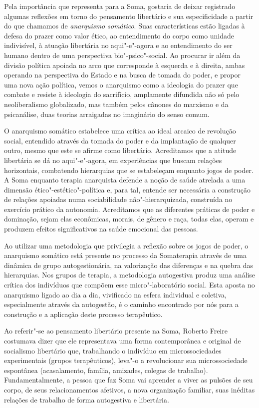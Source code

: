 Pela importância que representa para a Soma, gostaria de deixar
registrado algumas reflexões em torno do pensamento libertário e sua
especificidade a partir do que chamamos de \emph{anarquismo somático}. Suas
características estão ligadas à defesa do prazer como valor ético, ao
entendimento do corpo como unidade indivisível, à atuação libertária no
aqui"-e"-agora e ao entendimento do ser humano dentro de uma perspectiva
bio"-psico"-social. Ao procurar ir além da divisão política apoiada no
arco que corresponde à esquerda e à direita, ambas operando na
perspectiva do Estado e na busca de tomada do poder, e propor uma nova
ação política, vemos o anarquismo como a ideologia do prazer que combate
e resiste à ideologia do sacrifício, amplamente difundida não só pelo
neoliberalismo globalizado, mas também pelos cânones do marxismo e da
psicanálise, duas teorias arraigadas no imaginário do senso comum.

O anarquismo somático estabelece uma crítica ao ideal arcaico de
revolução social, entendido através da tomada do poder e da implantação
de qualquer outro, mesmo que este se afirme como libertário. Acreditamos
que a atitude libertária se dá no aqui"-e"-agora, em experiências que
buscam relações horizontais, combatendo hierarquias que se estabeleçam
enquanto jogos de poder. A Soma enquanto terapia anarquista defende a
noção de saúde atrelada a uma dimensão ético"-estético"-política e, para
tal, entende ser necessária a construção de relações apoiadas numa
sociabilidade não"-hierarquizada, construída no exercício prático da
autonomia. Acreditamos que as diferentes práticas de poder e dominação,
sejam elas econômicas, morais, de gênero e raça, todas elas, operam e
produzem efeitos significativos na saúde emocional das pessoas.

Ao utilizar uma metodologia que privilegia a reflexão sobre os jogos de
poder, o anarquismo somático está presente no processo da Somaterapia
através de uma dinâmica de grupo autogestionária, na valorização das
diferenças e na quebra das hierarquias. Nos grupos de terapia, a
metodologia autogestiva produz uma análise crítica dos indivíduos que
compõem esse micro"-laboratório social. Esta aposta no anarquismo ligado
ao dia a dia, vivificado na esfera individual e coletiva, especialmente
através da autogestão, é o caminho encontrado por nós para a construção
e a aplicação deste processo terapêutico.

Ao referir"-se ao pensamento libertário presente na Soma, Roberto Freire
costumava dizer que ele representava uma forma contemporânea e original
de socialismo libertário que, trabalhando o indivíduo em
microssociedades experimentais (grupos terapêuticos), leva"-o a
revolucionar sua microssociedade espontânea (acasalamento, família,
amizades, colegas de trabalho). Fundamentalmente, a pessoa que faz Soma
vai aprender a viver as pulsões de seu corpo, de seus relacionamentos
afetivos, a nova organização familiar, suas inéditas relações de
trabalho de forma autogestiva e libertária.

